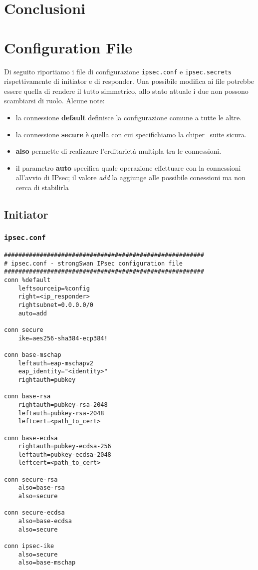 \documentclass[
10pt, %
a4paper, %
oneside, %
headinclude,footinclude, %
BCOR5mm, %
]{scrartcl}
\begin{document}
\section{Conclusioni}

\newpage

\appendix

\section{Configuration File}
\hypertarget{configuration}{}
Di seguito riportiamo i file di configurazione \lstinline|ipsec.conf| e \lstinline|ipsec.secrets| rispettivamente di 
initiator e di responder. Una possibile modifica ai file potrebbe essere quella di rendere il tutto simmetrico, allo stato 
attuale i due non possono scambiarsi di ruolo. Alcune note:

\begin{itemize}
    \item la connessione \textbf{default} definisce la configurazione comune a tutte le altre.
    \item la connessione \textbf{secure} è quella con cui specifichiamo la chiper\_suite sicura.
    \item \textbf{also} permette di realizzare l'erditarietà multipla tra le connessioni.
    \item il parametro \textbf{auto} specifica quale operazione effettuare con la connessioni all'avvio di IPsec; il valore \textit{add} la aggiunge alle possibile conessioni ma non cerca di stabilirla
\end{itemize}

\subsection{Initiator}

\subsubsection*{\lstinline|ipsec.conf|}
\begin{lstlisting}
########################################################
# ipsec.conf - strongSwan IPsec configuration file
########################################################
conn %default
    leftsourceip=%config
    right=<ip_responder>
    rightsubnet=0.0.0.0/0
    auto=add

conn secure
    ike=aes256-sha384-ecp384!

conn base-mschap
    leftauth=eap-mschapv2
    eap_identity="<identity>"
    rightauth=pubkey

conn base-rsa
    rightauth=pubkey-rsa-2048
    leftauth=pubkey-rsa-2048
    leftcert=<path_to_cert>

conn base-ecdsa
    rightauth=pubkey-ecdsa-256
    leftauth=pubkey-ecdsa-2048
    leftcert=<path_to_cert>

conn secure-rsa
    also=base-rsa
    also=secure

conn secure-ecdsa
    also=base-ecdsa
    also=secure

conn ipsec-ike
    also=secure
    also=base-mschap
\end{lstlisting}
\newpage
\end{document}
